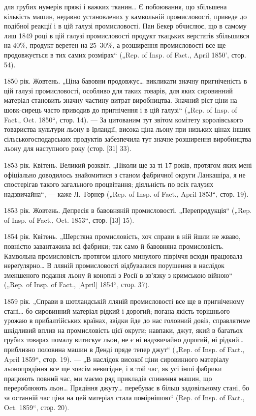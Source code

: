 \parcont{}  %
для грубих нумерів пряжі і важких тканин\dots{} Є побоювання, що
збільшена кількість машин, недавно установлених у камвольній
промисловості, приведе до подібної реакції і в цій галузі промисловості.
Пан Бекер обчислює, що в самому лиш 1849 році в цій
галузі промисловості продукт ткацьких верстатів збільшився на
40\%, продукт веретен на 25--30\%, а розширення промисловості
все ще продовжується в тих самих розмірах“ („Rep. of Insp.
of Fact., April 1850', стор. 54).

1850 рік. Жовтень. „Ціна бавовни продовжує\dots{} викликати
значну пригніченість в цій галузі промисловості, особливо для
таких товарів, для яких сировинний матеріал становить значну
частину витрат виробництва. Значний ріст ціни на шовк-сирець
часто приводив до пригнічення і в цій галузі“ („Rep. of Insp. of
Fact., Oct. 1850“, стор. 14). — За цитованим тут звітом комітету
королівського товариства культури льону в Ірландії, висока
ціна льону при низьких цінах інших сільськогосподарських продуктів
забезпечила тут значне розширення виробництва льону
для наступного року (стор. [31] 33).

1853 рік. Квітень. Великий розквіт. „Ніколи ще за ті 17 років,
протягом яких мені офіціально доводилось знайомитися з станом
фабричної округи Ланкашіра, я не спостерігав такого загального
процвітання; діяльність по всіх галузях надзвичайна“, —
каже Л.~Горнер („Rep. of Insp. of Fact., April 1853“, стор. 19).

1853 рік. Жовтень. Депресія в бавовняній промисловості.
„Перепродукція“ („Rep. of Insp. of Fact., Oct. 1853“, стор. [13] 15).

1854 рік. Квітень. „Шерстяна промисловість, хоч справи в ній
йшли не жваво, повністю завантажила всі фабрики; так само
й бавовняна промисловість. Камвольна промисловість протягом
цілого минулого півріччя всюди працювала нереґулярно\dots{} В лляній
промисловості відбувалися порушення в наслідок зменшеного
подання льону й коноплі з Росії в зв’язку з кримською війною“
(„Rep. of Insp. of Fact., [April] 1854“, стор. 37).

1859 рік. „Справи в шотландській лляній промисловості все
ще в пригніченому стані\dots{} бо сировинний матеріал рідкий і дорогий;
погана якість торішнього урожаю в прибалтійських країнах,
звідки йде до нас головний довіз, справлятиме шкідливий вплив
на промисловість цієї округи; навпаки, джут, який в багатьох
грубих товарах помалу витискує льон, не є ні надзвичайно дорогий,
ні рідкий\dots{} приблизно половина машин в Денді пряде
тепер джут“ („Rep. of Insp. of Fact., April 1859“, стор. 19). —
„В наслідок високої ціни сировинного матеріалу льонопрядіння
все ще зовсім невигідне, і в той час, як усі інші фабрики працюють
повний час, ми маємо ряд прикладів спинення машин,
що перероблюють льон\dots{} Прядіння джуту\dots{} перебуває в більш
задовільному стані, бо за останній час ціна на цей матеріал
стала помірнішою“ (Rep. of Insp. of Fact., Oct. 1859“, стор. 20).
